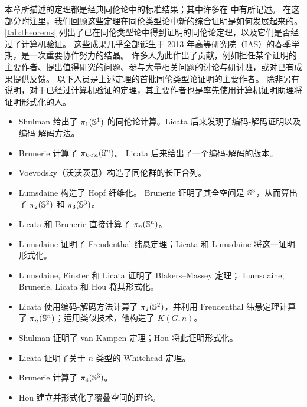 本章所描述的定理都是经典同伦论中的标准结果；其中许多在 \cite{hatcher02topology} 中有所记述。
在这部分附注里，我们回顾这些定理在同伦类型论中新的综合证明是如何发展起来的。
\cref{tab:theorems} 列出了已在同伦类型论中得到证明的同伦论定理，以及它们是否经过了计算机验证。
这些成果几乎全部诞生于 2013 年高等研究院（IAS）的春季学期，是一次重要协作努力的结晶。
许多人为此作出了贡献，例如担任某个证明的主要作者、提出值得研究的问题、参与大量相关问题的讨论与研讨班，或对已有成果提供反馈。
以下人员是上述定理的首批同伦类型论证明的主要作者。
除非另有说明，对于已经过计算机验证的定理，其主要作者也是率先使用计算机证明助理将证明形式化的人。

\begin{itemize}
\item
Shulman 给出了 $\pi_1(\mathbb{S}^1)$ 的同伦论计算。Licata 后来发现了编码-解码证明以及编码-解码方法。

\item
Brunerie 计算了 $\pi_{k<n}(\mathbb{S} ^ n)$。
Licata 后来给出了一个编码-解码的版本。

\item Voevodsky（沃沃茨基）构造了同伦群的长正合列。

\item Lumsdaine 构造了 Hopf 纤维化。
  Brunerie 证明了其全空间是 $\mathbb{S} ^3$，从而算出了 $\pi_2(\mathbb{S} ^2)$ 和 $\pi_3(\mathbb{S} ^3)$。

\item Licata 和 Brunerie 直接计算了 $\pi_n(\mathbb{S} ^n)$。

\item
  Lumsdaine 证明了 Freudenthal 纬悬定理；Licata 和 Lumsdaine 将这一证明形式化。
\item Lumsdaine, Finster 和 Licata 证明了 Blakers--Massey 定理；
  Lumsdaine, Brunerie, Licata 和 Hou 将其形式化。

\item
Licata 使用编码-解码方法计算了 $\pi_2(\mathbb{S} ^2)$，并利用 Freudenthal 纬悬定理计算了 $\pi_n(\mathbb{S} ^n)$；运用类似技术，他构造了 $K(G,n)$。

\item
Shulman 证明了 van Kampen 定理；Hou 将此证明形式化。

\item
Licata 证明了关于 $n$-类型的 Whitehead 定理。

\item Brunerie 计算了 $\pi_4(\mathbb{S} ^3)$。

\item
Hou 建立并形式化了覆叠空间的理论。
\end{itemize}

